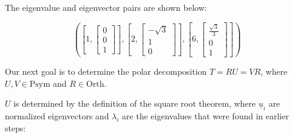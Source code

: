 The eigenvalue and eigenvector pairs are shown below:

$$
\left( [1,\begin{bmatrix}
0 \\
0 \\
1
\end{bmatrix}], [2,\begin{bmatrix}
-\sqrt{ 3 } \\
1 \\
0
\end{bmatrix}],
\left[ 6,\begin{bmatrix}
\frac{\sqrt{ 3 }}{3} \\
0 \\
1
\end{bmatrix} \right] \right)
$$

Our next goal is to determine the polar decomposition $T=RU=VR$, where $U,V\in \text{Psym}$ and $R\in \text{Orth}$. 

$U$ is determined by the definition of the square root theorem, where $\underline{u}_{i}$ are normalized eigenvectors and $\lambda_{i}$ are the eigenvalues that were found in earlier steps:


